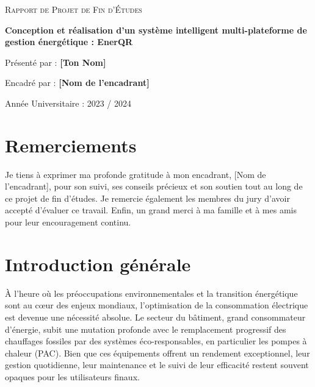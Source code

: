 \documentclass[12pt,a4paper]{report}
\begin{document}
\begin{titlepage}
    \centering
    \vspace*{2cm}
    {\scshape\LARGE Rapport de Projet de Fin d'Études \par}
    \vspace{1.5cm}
    {\huge\bfseries Conception et réalisation d'un système intelligent multi-plateforme de gestion énergétique : EnerQR\par}
    \vspace{2cm}
    {\Large Présenté par : \textbf{[Ton Nom]}\par}
    \vspace{1cm}
    {\large Encadré par : \textbf{[Nom de l'encadrant]}\par}
    \vfill
    {\large Année Universitaire : 2023 / 2024 \par}
\end{titlepage}

\chapter*{Remerciements}
Je tiens à exprimer ma profonde gratitude à mon encadrant, [Nom de l'encadrant], pour son suivi, ses conseils précieux et son soutien tout au long de ce projet de fin d'études. Je remercie également les membres du jury d'avoir accepté d'évaluer ce travail. Enfin, un grand merci à ma famille et à mes amis pour leur encouragement continu.

\tableofcontents
\listoffigures

\chapter*{Introduction générale}

À l'heure où les préoccupations environnementales et la transition énergétique sont au cœur des enjeux mondiaux, l'optimisation de la consommation électrique est devenue une nécessité absolue. Le secteur du bâtiment, grand consommateur d'énergie, subit une mutation profonde avec le remplacement progressif des chauffages fossiles par des systèmes éco-responsables, en particulier les pompes à chaleur (PAC). Bien que ces équipements offrent un rendement exceptionnel, leur gestion quotidienne, leur maintenance et le suivi de leur efficacité restent souvent opaques pour les utilisateurs finaux.
\end{document}
